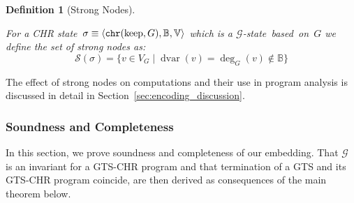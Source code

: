 \documentclass{tlp}
\newtheorem{definition}{Definition}[section]
\newcommand{\st}[3]{\ensuremath{\langle #1 , #2 , #3 \rangle}}
\newcommand{\mcG}{\ensuremath{\mathcal{G}}}
\newcommand{\bbB}{\ensuremath{\mathbb{B}}}
\newcommand{\bbV}{\ensuremath{\mathbb{V}}}
\DeclareMathOperator{\dvar}{dvar}
\DeclareMathOperator{\kp}{keep}
\newcommand{\chr}{\ensuremath{{\tt chr}}}
\newcommand{\strong}{\ensuremath{\mathcal{S}}}
\begin{document}
\begin{definition}[Strong Nodes]\label{def:strong_state}

For a CHR state~$\sigma \equiv \st{\chr(\kp,G)}{\bbB}{\bbV}$ which is a
\mcG-state~based~on~$G$ we define the set of \emph{strong nodes} as: \[
\strong(\sigma) = \{ v \in V_G \mid \dvar(v) = \deg_G(v) \not \in \bbB\} \]
\end{definition}

The effect of strong nodes on computations and their use in program analysis is
discussed in detail in Section~\ref{sec:encoding_discussion}.

\subsubsection{Soundness and Completeness}
\label{sec:sound_complete}

In this section, we prove soundness and completeness of our embedding. That
$\mcG$ is an invariant for a GTS-CHR program and that termination of a GTS and
its GTS-CHR program coincide, are then derived as consequences of the main
theorem below.
\end{document}
